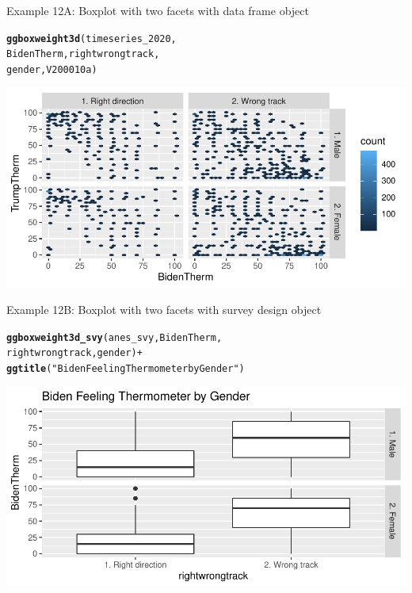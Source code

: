 \documentclass{beamer}\usepackage[]{graphicx}\usepackage[]{xcolor}
\makeatletter
\newcommand{\hlstr}[1]{\textcolor[rgb]{0.192,0.494,0.8}{#1}}%
\newcommand{\hlopt}[1]{\textcolor[rgb]{0,0,0}{#1}}%
\newcommand{\hlstd}[1]{\textcolor[rgb]{0.345,0.345,0.345}{#1}}%
\newcommand{\hlkwd}[1]{\textcolor[rgb]{0.737,0.353,0.396}{\textbf{#1}}}%
\newenvironment{kframe}{%
 \def\at@end@of@kframe{}%
 \ifinner\ifhmode%
  \def\at@end@of@kframe{\end{minipage}}%
  \begin{minipage}{\columnwidth}%
 \fi\fi%
 \def\FrameCommand##1{\hskip\@totalleftmargin \hskip-\fboxsep
 \colorbox{shadecolor}{##1}\hskip-\fboxsep
     \hskip-\linewidth \hskip-\@totalleftmargin \hskip\columnwidth}%
 \MakeFramed {\advance\hsize-\width
   \@totalleftmargin\z@ \linewidth\hsize
   \@setminipage}}%
 {\par\unskip\endMakeFramed%
 \at@end@of@kframe}
\newenvironment{knitrout}{}{} %
\makeatother
\begin{document}
\begin{frame}[fragile]{Example 12A: Boxplot with two facets with data frame object}
\begin{knitrout}
\color{fgcolor}\begin{kframe}
\begin{alltt}
\hlkwd{ggboxweight3d}\hlstd{(timeseries_2020,}
    \hlstd{BidenTherm, rightwrongtrack,}
    \hlstd{gender, V200010a)}
\end{alltt}
\end{kframe}
\includegraphics[width=0.95\linewidth]{figure/unnamed-chunk-68-1} 
\end{knitrout}

\end{frame}

\begin{frame}[fragile]{Example 12B: Boxplot with two facets with survey design object}
\begin{knitrout}
\color{fgcolor}\begin{kframe}
\begin{alltt}
\hlkwd{ggboxweight3d_svy}\hlstd{(anes_svy, BidenTherm,}
    \hlstd{rightwrongtrack, gender)} \hlopt{+}
    \hlkwd{ggtitle}\hlstd{(}\hlstr{"Biden Feeling Thermometer by Gender"}\hlstd{)}
\end{alltt}
\end{kframe}
\includegraphics[width=0.95\linewidth]{figure/unnamed-chunk-69-1} 
\end{knitrout}

\end{frame}
\end{document}

